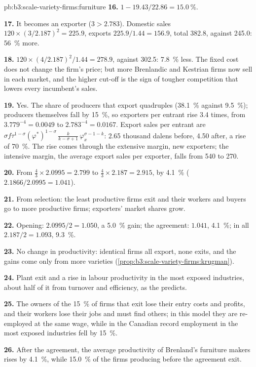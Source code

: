 \begin{solution}{pb:b3:scale-variety-firms:furniture}
\textbf{16.} $1 - 19.43/22.86 = 15.0~\%$.

\textbf{17.} It becomes an exporter ($3 > 2.783$). Domestic sales $120 \times (3/2.187)^2 =
225.9$, exports $225.9/1.44 = 156.9$, total 382.8, against 245.0: 56~\% more.

\textbf{18.} $120 \times (4/2.187)^2/1.44 = 278.9$, against 302.5: 7.8~\% less. The fixed
cost does not change the firm's price; but more Brenlandic and Kestrian firms now
sell in each market, and the higher cut-off is the sign of tougher competition
that lowers every incumbent's sales.

\textbf{19.} Yes. The share of producers that export quadruples (38.1~\% against
9.5~\%); producers themselves fall by 15~\%, so exporters per entrant rise 3.4 times,
from $3.779^{-4} = 0.0049$ to $2.783^{-4} = 0.0167$. Export sales per entrant are
$\sigma f \tau^{1-\sigma} (\varphi^*)^{1-\sigma}\, \tfrac{k}{k-\sigma+1}\,
\varphi_x^{\sigma-1-k}$: 2.65 thousand dalens before, 4.50 after, a rise of 70~\%. The
rise comes through the extensive margin, new exporters; the intensive margin, the
average export sales per exporter, falls from 540 to 270.

\textbf{20.} From $\tfrac43 \times 2.0995 = 2.799$ to $\tfrac43 \times 2.187 = 2.915$, by 4.1~\%
($2.1866/2.0995 = 1.041$).

\textbf{21.} From selection: the least productive firms exit and their workers
and buyers go to more productive firms; exporters' market shares grow.

\textbf{22.} Opening: $2.0995/2 = 1.050$, a 5.0~\% gain; the agreement: $1.041$, 4.1~\%;
in all $2.187/2 = 1.093$, 9.3~\%.

\textbf{23.} No change in productivity: identical firms all export, none exits,
and the gains come only from more varieties
(\cref{prop:b3:scale-variety-firms:krugman}).

\textbf{24.} Plant exit and a rise in labour productivity in the most exposed
industries, about half of it from turnover and efficiency, as the
 predicts. %

\textbf{25.} The owners of the 15~\% of firms that exit lose their entry costs and
profits, and their workers lose their jobs and must find others; in this model
they are re-employed at the same wage, while in the Canadian record employment in
the most exposed industries fell by 15~\%.

\textbf{26.} After the agreement, the average productivity of Brenland's furniture
makers rises by 4.1~\%, while 15.0~\% of the firms producing before the agreement
exit.
\end{solution}
